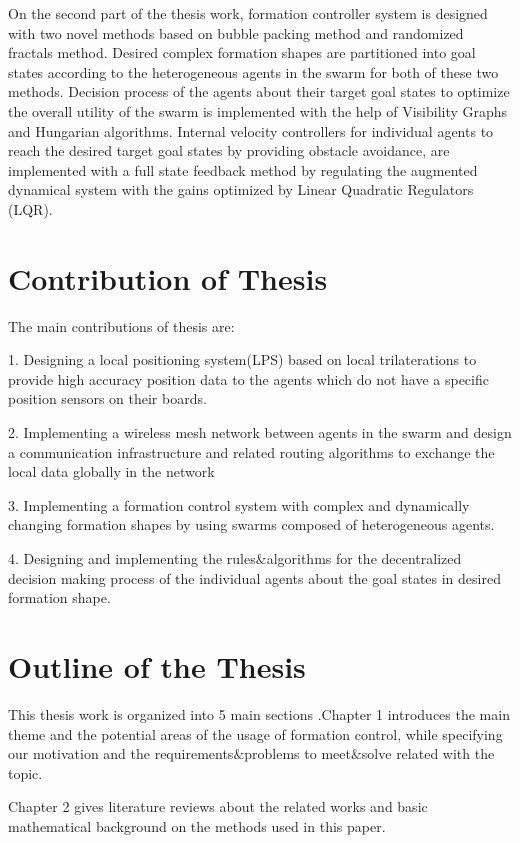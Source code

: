 On the second part of the thesis work, formation controller system is designed with two novel methods based on bubble packing method and randomized fractals method. Desired complex formation shapes are partitioned into goal states according to the heterogeneous agents in the swarm for both of these two methods. Decision process of the agents about their target goal states to optimize the overall utility of the swarm is implemented with the help of Visibility Graphs and Hungarian algorithms. Internal velocity controllers for individual agents to reach the desired target goal states by providing obstacle avoidance, are implemented with a full state feedback method by regulating the augmented dynamical system with the gains optimized by Linear Quadratic Regulators (LQR).

\section{Contribution of Thesis}
The main contributions of thesis are:

1. Designing a local positioning system(LPS) based on local trilaterations to provide high accuracy position data to the agents which do not have a specific position sensors on their boards.

2. Implementing a wireless mesh network between agents in the swarm and design a communication infrastructure and related routing algorithms to exchange the local data globally in the network

3. Implementing a formation control system with complex and dynamically changing formation shapes by using swarms composed of heterogeneous agents.

4. Designing and implementing the rules$\&$algorithms for the decentralized decision making process of the individual agents about the goal states in desired formation shape.


\section{Outline of the Thesis}
This thesis work is organized into 5 main sections .Chapter 1 introduces the main theme and the potential areas of the usage of formation control, while specifying our motivation and the requirements$\&$problems to meet$\&$solve related with the topic.

Chapter 2 gives literature reviews about the related works and basic mathematical background on the methods used in this paper.

